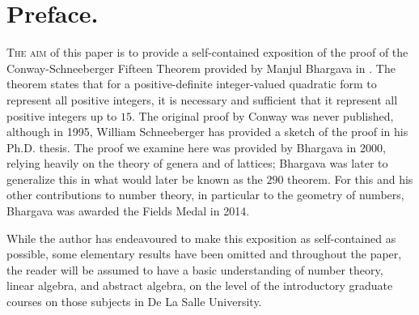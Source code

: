 \chapter*{Preface.}

{\scshape The aim} of this paper is to provide a self-contained exposition of the proof of the Conway-Schneeberger Fifteen Theorem provided by Manjul Bhargava in \cite{bhargava2000conway}. The theorem states that for a positive-definite integer-valued quadratic form to represent all positive integers, it is necessary and sufficient that it represent all positive integers up to \(15\). The original proof by Conway was never published, although in 1995, William Schneeberger has provided a sketch of the proof in his Ph.D. thesis. \cite{schneeberger1997arithmetic} The proof we examine here was provided by Bhargava in 2000, relying heavily on the theory of genera and of lattices; Bhargava was later to generalize this in what would later be known as the \(290\) theorem. \cite{bhargava2005universal} For this and his other contributions to number theory, in particular to the geometry of numbers, Bhargava was awarded the Fields Medal in 2014. \cite{bhargava2014fields}

While the author has endeavoured to make this exposition as self-contained as possible, some elementary results have been omitted and throughout the paper, the reader will be assumed to have a basic understanding of number theory, linear algebra, and abstract algebra, on the level of the introductory graduate courses on those subjects in De La Salle University. 


